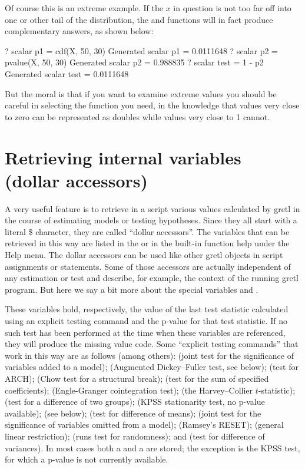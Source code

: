 Of course this is an extreme example.  If the $x$ in question is not
too far off into one or other tail of the distribution, the 
and  functions will in fact produce complementary
answers, as shown below:
\begin{code}
? scalar p1 = cdf(X, 50, 30)
Generated scalar p1 = 0.0111648
? scalar p2 = pvalue(X, 50, 30)
Generated scalar p2 = 0.988835
? scalar test = 1 - p2
Generated scalar test = 0.0111648
\end{code}
But the moral is that if you want to examine extreme values
you should be careful in selecting the function you need, in the
knowledge that values very close to zero can be represented as doubles
while values very close to 1 cannot.


\section{Retrieving internal variables (dollar accessors)}
\label{sec:genr-internal}

A very useful feature is to retrieve in a script various values
calculated by gretl in the course of estimating models or testing
hypotheses. Since they all start with a literal \$ character, they
are called ``dollar accessors''. The variables that can be retrieved
in this way are listed in the \GCR or in the built-in function help
under the Help menu. The dollar accessors can be used like other
gretl objects in script assignments or statements. Some of those
accessors are actually independent of any estimation or test and
describe, for example, the context of the running gretl program. 
But here we say a bit more about the special variables
 and .

These variables hold, respectively, the value of the last test
statistic calculated using an explicit testing command and the p-value
for that test statistic.  If no such test has been performed at the
time when these variables are referenced, they will produce the
missing value code.  Some ``explicit testing commands'' that work in
this way are as follows (among others):  (joint test for the 
significance of
variables added to a model);  (Augmented Dickey--Fuller test,
see below);  (test for ARCH);  (Chow test for a
structural break);  (test for the sum of specified
coefficients);  (Engle-Granger cointegration test);
 (the Harvey--Collier $t$-statistic); 
(test for a difference of two groups);
 (KPSS stationarity test, no p-value available);
 (see below);  (test for difference of
means);  (joint test for the significance of variables
omitted from a model);  (Ramsey's RESET); 
(general linear restriction);  (runs test for randomness);
and  (test for difference of variances). In most cases
both a  and a  are stored; the exception
is the KPSS test, for which a p-value is not currently available.

